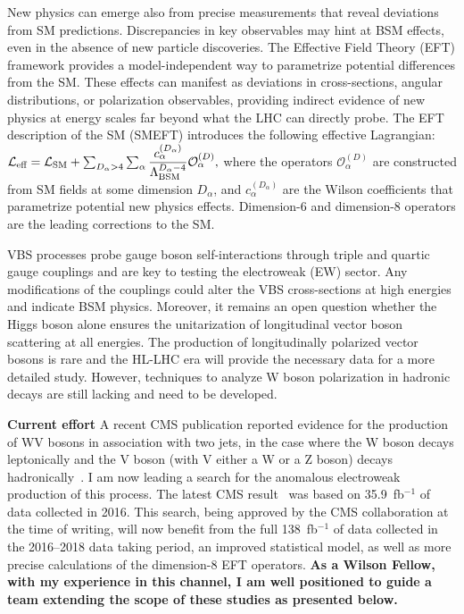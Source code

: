 {\begin{flushleft}
New physics can emerge also from precise measurements that reveal deviations from SM predictions. Discrepancies in key observables may hint at BSM effects, even in the absence of new particle discoveries. The Effective Field Theory (EFT) framework provides a model-independent way to parametrize potential differences from the SM. These effects can manifest as deviations in cross-sections, angular distributions, or polarization observables, providing indirect evidence of new physics at energy scales far beyond what the LHC can directly probe.
The EFT description of the SM (SMEFT) introduces the following effective Lagrangian:
\begin{math}
    \mathcal{L}_{\text{eff}} = \mathcal{L}_{\text{SM}} + \sum_{D_\alpha>4}\sum_{\alpha}\dfrac{c_\alpha^{(D_\alpha)}}{\Lambda_{\text{BSM}}^{D_\alpha-4}}\mathcal{O}^{(D)}_\alpha \space,
\end{math}
where the operators $\mathcal{O}_\alpha^{(D)}$ are constructed from SM fields at some dimension $D_\alpha$, and $c_\alpha^{(D_\alpha)}$ are the Wilson coefficients that parametrize potential new physics effects. Dimension-6 and dimension-8 operators are the leading corrections to the SM.

VBS processes probe gauge boson self-interactions through triple and quartic gauge couplings and are key to testing the electroweak (EW) sector. Any modifications of the couplings could alter the VBS cross-sections at high energies and indicate BSM physics.  
Moreover, it remains an open question whether the Higgs boson alone ensures the unitarization of longitudinal vector boson scattering at all energies. The production of longitudinally polarized vector bosons is rare and the HL-LHC era will provide the necessary data for a more detailed study. However, techniques to analyze W boson polarization in hadronic decays are still lacking and need to be developed.

\textbf{Current effort}
A recent CMS publication reported evidence for the production of WV bosons in association with two jets, in the case where the W boson decays leptonically and the V boson (with V either a W or a Z boson) decays hadronically~\cite{[2]}. I am now leading a search for the anomalous electroweak production of this process. The latest CMS result~\cite{[3]} was based on 35.9~fb$^{-1}$ of data collected in 2016. This search, being approved by the CMS collaboration at the time of writing, will now benefit from the full 138~fb$^{-1}$ of data collected in the 2016--2018 data taking period, an improved statistical model, as well as more precise calculations of the dimension-8 EFT operators. {\bf As a Wilson Fellow, with my experience in this channel, I am well positioned to guide a team extending the scope of these studies as presented below.}


\end{flushleft}}
